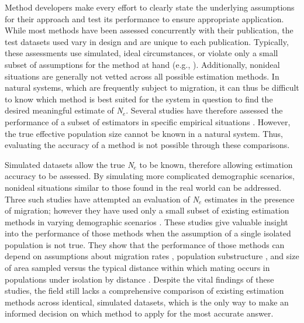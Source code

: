 Method developers make every effort to clearly state the underlying assumptions for their 
approach and test its performance to ensure appropriate application. While most methods have 
been assessed concurrently with their publication, the test datasets used vary in design and 
are unique to each publication. Typically, these assessments use simulated, ideal circumstances, 
or violate only a small subset of assumptions for the method at hand (e.g., \citealt{Vitalis:2001c, 
Beaumont:2003, Wang:2003, Anderson:2005, Wang:2009, Do:2014}). Additionally, 
nonideal situations are generally not vetted across all possible estimation methods. In natural 
systems, which are frequently subject to migration, it can thus be difficult to know which method 
is best suited for the system in question to find the desired meaningful estimate of \emph{N}$_e$. 
Several studies have therefore assessed the performance of a subset of estimators in specific 
empirical situations \citep{Barker:2011, Serbezov:2012, Holleley:2013, Macbeth:2013, 
Baalsrud:2014}. However, the true effective population size cannot be known in a natural 
system. Thus, evaluating the accuracy of a method is not possible through these comparisons.

Simulated datasets allow the true \emph{N}$_e$ to be known, therefore allowing estimation 
accuracy to be assessed. By simulating more complicated demographic scenarios, nonideal situations 
similar to those found in the real world can be addressed. Three such studies have attempted an 
evaluation of \emph{N}$_e$ estimates in the presence of migration; however they have used only 
a small subset of existing estimation methods in varying demographic scenarios \citep{Waples:2011, Neel:2013, Ryman:2013}. 
These studies give valuable insight into the performance of those 
methods when the assumption of a single isolated population is not true. They show that the performance 
of those methods can depend on assumptions about migration rates \citep{Waples:2011}, population 
substructure \citep{Ryman:2013}, and size of area sampled versus the typical distance within which 
mating occurs in populations under isolation by distance \citep{Neel:2013}. Despite the vital 
findings of these studies, the field still lacks a comprehensive comparison of existing estimation 
methods across identical, simulated datasets, which is the only way to make an informed decision on 
which method to apply for the most accurate answer.

